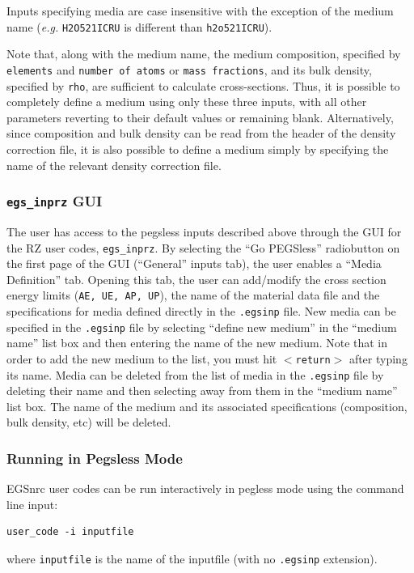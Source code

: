 \documentclass[12pt,twoside]{article}  %
\begin{document}
Inputs specifying media are case insensitive with the exception of the medium name ({\it e.g.} {\tt H2O521ICRU} is
different than {\tt h2o521ICRU}).

Note that, along with the medium name, the medium composition, specified by {\tt elements} and {\tt number of atoms} or {\tt mass fractions}, and its bulk density, specified by {\tt rho}, are
sufficient to calculate cross-sections.  Thus, it is possible to completely define a medium
using only these three inputs, with all other parameters reverting to their default values or remaining blank.
Alternatively, since composition and bulk density can be read from the header of the density correction file, it is also possible to define a medium
simply by specifying the name of the relevant density correction file.

\subsubsection{{\tt egs\_inprz} GUI}
The user has access to the pegsless inputs described above through the GUI for the RZ user codes, {\tt egs\_inprz}.
By selecting the ``Go PEGSless'' radiobutton on the first page of the GUI (``General'' inputs tab), the user enables
a ``Media Definition'' tab.  Opening this tab, the user can add/modify the cross section energy limits ({\tt AE, UE, AP, UP}),
the name of the material data file and the specifications for media defined directly in the {\tt .egsinp} file.  New media
can be specified in the {\tt .egsinp} file by selecting ``define new medium'' in the ``medium name'' list box and then entering the
name of the new medium.  Note that in order to add the new medium to the list, you must hit {\tt $<$return$>$} after
typing its name.  Media can be deleted from the list of media in the {\tt .egsinp} file by deleting their name and then
selecting away from them in the ``medium name'' list box.  The name of the medium and its associated specifications
(composition, bulk density, etc) will be deleted.

\subsubsection{Running in Pegsless Mode}

EGSnrc user codes can be run interactively in pegless mode using the command line input:
\begin{verbatim}
user_code -i inputfile
\end{verbatim}
where {\tt inputfile} is the name of the inputfile (with no
{\tt .egsinp} extension).
\end{document}
